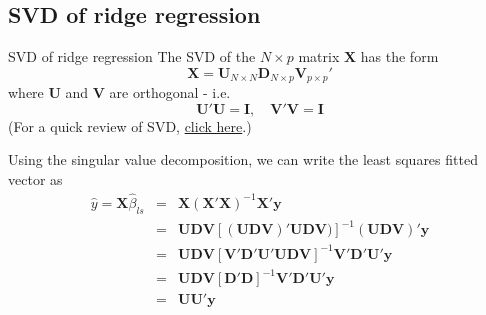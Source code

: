\documentclass{beamer}
\newcommand{\X}{\bm{X}}
\newcommand{\y}{\bm{y}}
\begin{document}
\subsection{SVD of ridge regression}
\begin{frame}{SVD of ridge regression}
The SVD of the $N\times p$ matrix $\X$ has the form
\[
\X=\bm{U}_{N\times N}\bm{D}_{N\times p}\bm{V}_{p\times p}'
\]
where $\bm{U}$ and $\bm{V}$ are orthogonal - i.e. 
\[
\bm{U}'\bm{U}=\bm{I},\quad \bm{V}'\bm{V}=\bm{I}
\]
(For a quick review of SVD, \href{https://mathworld.wolfram.com/SingularValueDecomposition.html}{click here}.)

Using the singular value decomposition, we can write the least squares fitted vector as 
\begin{eqnarray*}
\hat{y}=\X\hat{\beta}_{ls}&=&\X(\X'\X)^{-1}\X'\y\\
&=&\bm{UDV}[(\bm{UDV})'\bm{UDV})]^{-1}(\bm{UDV})'\y\\
&=&\bm{UDV}[\bm{V}'\bm{D}'\bm{U}'\bm{UDV}]^{-1}\bm{V}'\bm{D}'\bm{U}'\y\\
&=&\bm{UDV}[\bm{D}'\bm{D}]^{-1}\bm{V'}\bm{D'}\bm{U'}\y\\
&=&\bm{UU}'\y
\end{eqnarray*}
\end{frame}
%
%
\end{document}
